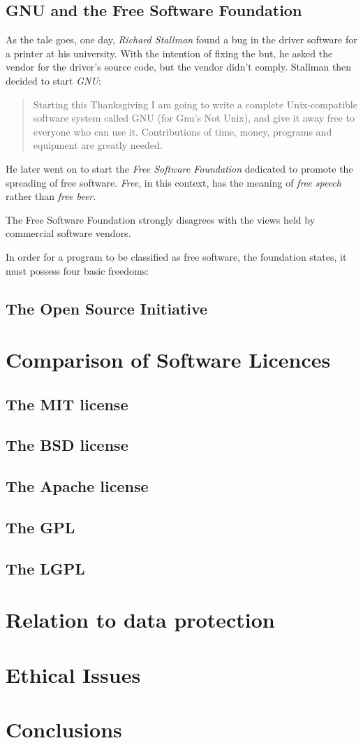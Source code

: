 \documentclass{article}
\begin{document}
\subsection{GNU and the Free Software Foundation}
As the tale goes, one day, \emph{Richard Stallman} found a bug
in the driver software for a printer at his university. With
the intention of fixing the but, he asked the vendor for the
driver's source code, but the vendor didn't comply. Stallman then
decided to start \emph{GNU}:
\begin{quote}
Starting this Thanksgiving I am going to write a complete
Unix-compatible software system called GNU (for Gnu's Not Unix),
and give it away free to everyone who can use it.
Contributions of time, money, programs and equipment
are greatly needed. 
\end{quote} 
He later went on to start the \emph{Free Software Foundation}
dedicated to promote the spreading of free software. \emph{Free},
in this context, has the meaning of \emph{free speech} rather than
\emph{free beer}.

The Free Software Foundation strongly disagrees with the views held
by commercial software vendors.

In order for a program to be classified as free
software, the foundation states, it must possess four basic freedoms:
\subsection{The Open Source Initiative}

\section{Comparison of Software Licences}
\subsection{The MIT license}
\subsection{The BSD license}
\subsection{The Apache license}
\subsection{The GPL}
\subsection{The LGPL}

\section{Relation to data protection}

\section{Ethical Issues}

\section{Conclusions}
\end{document}
